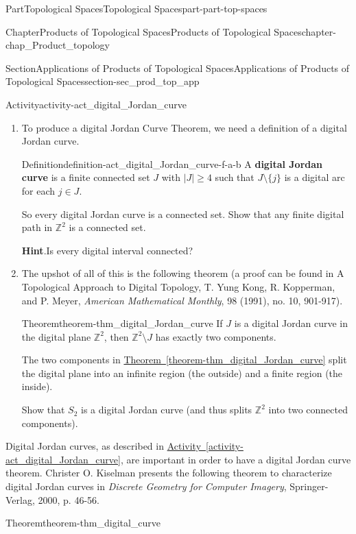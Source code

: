 \documentclass[oneside,10pt,]{book}
\newcommand{\blocktitlefont}{\relax}
\newcommand{\xreffont}{\relax}
\newcommand{\terminology}[1]{\textbf{#1}}
\newcommand{\pubtitle}[1]{\textsl{#1}}
\numberwithin{equation}{chapter}
\newcommand{\Z}{\mathbb{Z}}
\begin{document}
\begin{partptx}{Part}{Topological Spaces}{}{Topological Spaces}{}{}{part-part-top-spaces}
\begin{chapterptx}{Chapter}{Products of Topological Spaces}{}{Products of Topological Spaces}{}{}{chapter-chap_Product_topology}
\begin{sectionptx}{Section}{Applications of Products of Topological Spaces}{}{Applications of Products of Topological Spaces}{}{}{section-sec_prod_top_app}
\begin{activity}{Activity}{}{activity-act_digital_Jordan_curve}
\begin{enumerate}[font=\bfseries,label=(\alph*),ref=\alph*]
Show that \(S_1\) is not a digital path but \(S_2\) and \(S_3\) are digital paths.%
\item{}To produce a digital Jordan Curve Theorem, we need a definition of a digital Jordan curve.%
\begin{definition}{Definition}{}{definition-act_digital_Jordan_curve-f-a-b}%
%
A \terminology{digital Jordan curve} is a finite connected set \(J\) with \(|J| \geq 4\) such that \(J \setminus \{j\}\) is a digital arc for each \(j \in J\).%
\par
So every digital Jordan curve is a connected set. Show that any finite digital path in \(\Z^2\) is a connected set.%
\end{definition}
\par\smallskip%
\noindent\textbf{\blocktitlefont Hint}.\hypertarget{hint-act_digital_Jordan_curve-f-b}{}\quad{}Is every digital interval connected?%
\item{}The upshot of all of this is the following theorem (a proof can be found in A Topological Approach to Digital Topology, T. Yung Kong, R. Kopperman, and P. Meyer, \pubtitle{American Mathematical Monthly}, 98 (1991), no. 10, 901-917).%
\begin{theorem}{Theorem}{}{}{theorem-thm_digital_Jordan_curve}%
If \(J\) is a digital Jordan curve in the digital plane \(\Z^2\), then \(\Z^2 \setminus J\) has exactly two components.%
\end{theorem}
The two components in \hyperref[theorem-thm_digital_Jordan_curve]{Theorem~{\xreffont\ref{theorem-thm_digital_Jordan_curve}}} split the digital plane into an infinite region (the outside) and a finite region (the inside).%
\par
Show that \(S_2\) is a digital Jordan curve (and thus splits \(\Z^2\) into two connected components).%
\end{enumerate}%
\end{activity}%
Digital Jordan curves, as described in \hyperref[activity-act_digital_Jordan_curve]{Activity~{\xreffont\ref{activity-act_digital_Jordan_curve}}}, are important in order to have a digital Jordan curve theorem. Christer O. Kiselman presents the following theorem to characterize digital Jordan curves in \pubtitle{Discrete Geometry for Computer Imagery}, Springer-Verlag, 2000, p. 46-56.%
\begin{theorem}{Theorem}{}{}{theorem-thm_digital_curve}%

\end{theorem}
\end{sectionptx}
\end{chapterptx}
\end{partptx}
\end{document}
